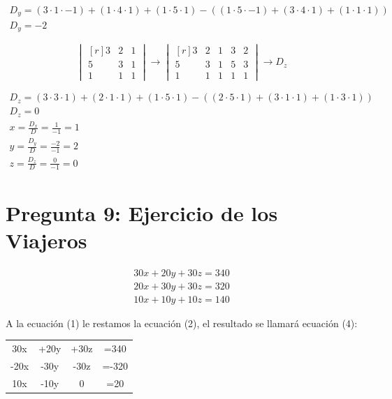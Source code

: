 \documentclass[a4paper, apacite, 12pt, doc]{apa6}
\begin{document}
\begin{itemize}
\begin{gather*}
D_y = (3 \cdot 1\cdot -1) + (1 \cdot 4 \cdot1 ) + (1 \cdot 5\cdot1 )
    -(( 1\cdot 5\cdot -1 ) + ( 3\cdot4 \cdot1 ) + ( 1\cdot 1\cdot1 )) \\
	D_y = -2
\end{gather*}




\[
	\begin{vmatrix*}[r]
		3 & 2 & 1 \\
		5 & 3 & 1 \\
		1 & 1 & 1
	\end{vmatrix*}
	\rightarrow
	\begin{vmatrix*}[r]
		3 & 2 & 1 & 3 & 2\\
		5 & 3 & 1 & 5 & 3\\
		1 & 1 & 1 & 1 & 1
	\end{vmatrix*}
	\rightarrow D_z
\]


\begin{gather*}
D_z = (3 \cdot3 \cdot 1) + (2 \cdot 1\cdot 1) + (1 \cdot 5\cdot 1)
-(( 2\cdot5 \cdot 1) + (3 \cdot1 \cdot1 ) + (1 \cdot3 \cdot1 )) \\
D_z = 0 \\
	x = \frac{D_x}{D} = \frac{1}{-1} = 1 \\
	y = \frac{D_y}{D} = \frac{-2}{-1} = 2 \\
	z = \frac{D_z}{D} = \frac{0}{-1} = 0
\end{gather*}
\end{itemize}


\section{Pregunta 9: Ejercicio de los Viajeros}

\begin{gather*}
	30x + 20y + 30z = 340 \\
	20x + 30y + 30z = 320 \\
	10x + 10y + 10z = 140
\end{gather*}

A la ecuación (1) le restamos la ecuación (2), el resultado se llamará ecuación (4):

\begin{center}
	\begin{tabular}{cccc}
		30x &+20y &+30z &=340 \\
		-20x &-30y &-30z &=-320 \\
		\hline
		10x & -10y & 0 &=20
	\end{tabular}
\end{center}
\end{document}
